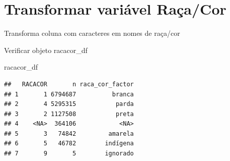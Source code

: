 \documentclass[
]{book}
\newenvironment{Shaded}{\begin{snugshade}}{\end{snugshade}}
\newcommand{\AttributeTok}[1]{\textcolor[rgb]{0.13,0.29,0.53}{#1}}
\newcommand{\FunctionTok}[1]{\textcolor[rgb]{0.13,0.29,0.53}{\textbf{#1}}}
\newcommand{\NormalTok}[1]{#1}
\newcommand{\OtherTok}[1]{\textcolor[rgb]{0.56,0.35,0.01}{#1}}
\newcommand{\SpecialCharTok}[1]{\textcolor[rgb]{0.81,0.36,0.00}{\textbf{#1}}}
\newcommand{\StringTok}[1]{\textcolor[rgb]{0.31,0.60,0.02}{#1}}
\begin{document}
\section{Transformar variável Raça/Cor}\label{transformar-variuxe1vel-rauxe7acor}

Transforma coluna com caracteres em nomes de raça/cor

\begin{Shaded}
\end{Shaded}

\hfill\break

Verificar objeto racacor\_df

\begin{Shaded}
\begin{Highlighting}[]
\NormalTok{racacor\_df}
\end{Highlighting}
\end{Shaded}

\begin{verbatim}
##   RACACOR       n raca_cor_factor
## 1       1 6794687          branca
## 2       4 5295315           parda
## 3       2 1127508           preta
## 4    <NA>  364106            <NA>
## 5       3   74842         amarela
## 6       5   46782        indígena
## 7       9       5        ignorado
\end{verbatim}
\end{document}

